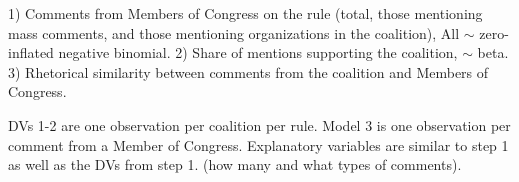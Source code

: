 1) Comments from Members of Congress on the rule (total, those mentioning mass comments, and those mentioning organizations in the coalition), All  $\sim$ zero-inflated negative binomial. 
2) Share of mentions supporting the coalition,  $\sim$  beta. 
3) Rhetorical similarity between comments from the coalition and Members of Congress. 

DVs 1-2 are one observation per coalition per rule. Model 3 is one observation per comment from a Member of Congress. Explanatory variables are similar to step 1 as well as the DVs from step 1. (how many and what types of comments).%






